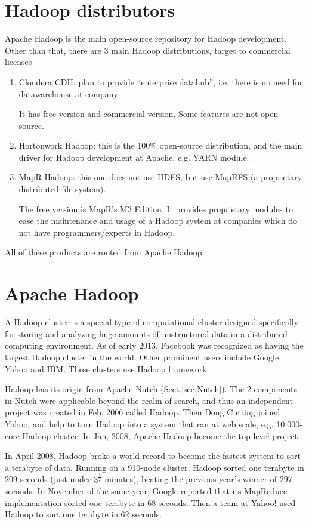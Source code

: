 \section{Hadoop distributors}

Apache Hadoop is the main open-source repository for Hadoop development. Other
than that, there are 3 main Hadoop distributions, target to commercial licenses
\begin{enumerate}
  \item Cloudera CDH: plan to provide ``enterprise datahub'', i.e. there is no
  need for datawarehouse at company
  
  It has free version and commercial version. Some features are not open-source.
  
  \item Hortonwork Hadoop: this is the 100\% open-source distribution, and the
  main driver for Hadoop development at Apache, e.g. YARN module.
  
  \item MapR Hadoop: this one does not use HDFS, but use MapRFS (a proprietary
  distributed file system). 
  
  The free version is MapR's M3 Edition. It provides proprietary modules to ease
  the maintenance and usage of a Hadoop system at companies which do not have
  programmers/experts in Hadoop.
\end{enumerate}
All of these products are rooted from Apache Hadoop.

\section{Apache Hadoop}

A Hadoop cluster is a special type of computational cluster designed
specifically for storing and analyzing huge amounts of unstructured data in a
distributed computing environment. As of early 2013, Facebook was recognized as
having the largest Hadoop cluster in the world. Other prominent users include
Google, Yahoo and IBM. These clusters use Hadoop framework. 

Hadoop has its origin from Apache Nutch (Sect.\ref{sec:Nutch}).
The 2 components in Nutch were applicable beyond the realm of search, and thus
an independent project was created in Feb, 2006 called Hadoop. Then Doug Cutting
joined Yahoo, and help to turn Hadoop into a system that ran at web scale, e.g.
10,000-core Hadoop cluster. In Jan, 2008, Apache Hadoop become the top-level
project. 

In April 2008, Hadoop broke a world record to become the fastest system to sort
a terabyte of data. Running on a 910-node cluster, Hadoop sorted one terabyte in
209 seconds (just under $3^\frac{1}{2}$ minutes), beating the previous year's winner
of 297 seconds. In November of the same year, Google reported that its MapReduce
implementation sorted one terabyte in 68 seconds. Then a team at
Yahoo! used Hadoop to sort one terabyte in 62 seconds.

